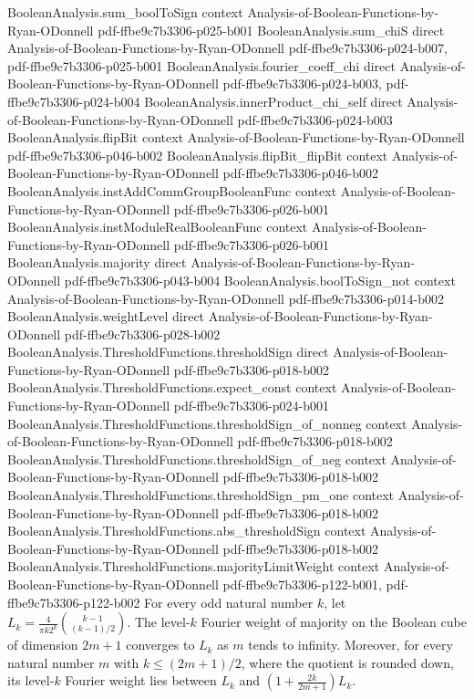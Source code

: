 \begin{theorem}
\proofstep
  {BooleanAnalysis.sum_boolToSign}
  {context}
  {Analysis-of-Boolean-Functions-by-Ryan-ODonnell}
  {pdf-ffbe9c7b3306-p025-b001}
\proofstep
  {BooleanAnalysis.sum_chiS}
  {direct}
  {Analysis-of-Boolean-Functions-by-Ryan-ODonnell}
  {pdf-ffbe9c7b3306-p024-b007,
    pdf-ffbe9c7b3306-p025-b001}
\proofstep
  {BooleanAnalysis.fourier_coeff_chi}
  {direct}
  {Analysis-of-Boolean-Functions-by-Ryan-ODonnell}
  {pdf-ffbe9c7b3306-p024-b003,
    pdf-ffbe9c7b3306-p024-b004}
\proofstep
  {BooleanAnalysis.innerProduct_chi_self}
  {direct}
  {Analysis-of-Boolean-Functions-by-Ryan-ODonnell}
  {pdf-ffbe9c7b3306-p024-b003}
\proofstep
  {BooleanAnalysis.flipBit}
  {context}
  {Analysis-of-Boolean-Functions-by-Ryan-ODonnell}
  {pdf-ffbe9c7b3306-p046-b002}
\proofstep
  {BooleanAnalysis.flipBit_flipBit}
  {context}
  {Analysis-of-Boolean-Functions-by-Ryan-ODonnell}
  {pdf-ffbe9c7b3306-p046-b002}
\proofstep
  {BooleanAnalysis.instAddCommGroupBooleanFunc}
  {context}
  {Analysis-of-Boolean-Functions-by-Ryan-ODonnell}
  {pdf-ffbe9c7b3306-p026-b001}
\proofstep
  {BooleanAnalysis.instModuleRealBooleanFunc}
  {context}
  {Analysis-of-Boolean-Functions-by-Ryan-ODonnell}
  {pdf-ffbe9c7b3306-p026-b001}
\proofstep
  {BooleanAnalysis.majority}
  {direct}
  {Analysis-of-Boolean-Functions-by-Ryan-ODonnell}
  {pdf-ffbe9c7b3306-p043-b004}
\proofstep
  {BooleanAnalysis.boolToSign_not}
  {context}
  {Analysis-of-Boolean-Functions-by-Ryan-ODonnell}
  {pdf-ffbe9c7b3306-p014-b002}
\proofstep
  {BooleanAnalysis.weightLevel}
  {direct}
  {Analysis-of-Boolean-Functions-by-Ryan-ODonnell}
  {pdf-ffbe9c7b3306-p028-b002}
\proofstep
  {BooleanAnalysis.ThresholdFunctions.thresholdSign}
  {direct}
  {Analysis-of-Boolean-Functions-by-Ryan-ODonnell}
  {pdf-ffbe9c7b3306-p018-b002}
\proofstep
  {BooleanAnalysis.ThresholdFunctions.expect_const}
  {context}
  {Analysis-of-Boolean-Functions-by-Ryan-ODonnell}
  {pdf-ffbe9c7b3306-p024-b001}
\proofstep
  {BooleanAnalysis.ThresholdFunctions.thresholdSign_of_nonneg}
  {context}
  {Analysis-of-Boolean-Functions-by-Ryan-ODonnell}
  {pdf-ffbe9c7b3306-p018-b002}
\proofstep
  {BooleanAnalysis.ThresholdFunctions.thresholdSign_of_neg}
  {context}
  {Analysis-of-Boolean-Functions-by-Ryan-ODonnell}
  {pdf-ffbe9c7b3306-p018-b002}
\proofstep
  {BooleanAnalysis.ThresholdFunctions.thresholdSign_pm_one}
  {context}
  {Analysis-of-Boolean-Functions-by-Ryan-ODonnell}
  {pdf-ffbe9c7b3306-p018-b002}
\proofstep
  {BooleanAnalysis.ThresholdFunctions.abs_thresholdSign}
  {context}
  {Analysis-of-Boolean-Functions-by-Ryan-ODonnell}
  {pdf-ffbe9c7b3306-p018-b002}
\proofstep
  {BooleanAnalysis.ThresholdFunctions.majorityLimitWeight}
  {context}
  {Analysis-of-Boolean-Functions-by-Ryan-ODonnell}
  {pdf-ffbe9c7b3306-p122-b001,
    pdf-ffbe9c7b3306-p122-b002}
For every odd natural number $k$, let $L_k=\frac{4}{\pi k2^k}\binom{k-1}{(k-1)/2}$. The
level-$k$ Fourier weight of majority on the Boolean cube of dimension $2m+1$ converges
to $L_k$ as $m$ tends to infinity. Moreover, for every natural number $m$ with $k\le
(2m+1)/2$, where the quotient is rounded down, its level-$k$ Fourier weight lies between
$L_k$ and $\left(1+\frac{2k}{2m+1}\right)L_k$.
\end{theorem}

